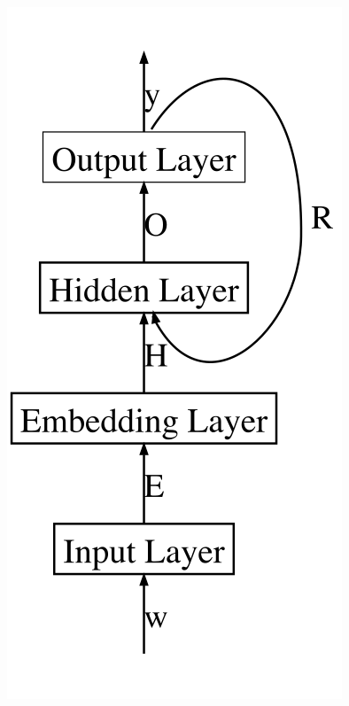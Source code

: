 \documentclass[citation\_needed]{subfiles}
\begin{document}
\begin{figure}[ht!]
\begin{minipage}{0.325\linewidth}
    \includegraphics[scale=0.4]{images/NN/LD-RNN/JordanRNN_inkscape}
    \end{minipage}
    \begin{minipage}{0.325\linewidth}
    \centering

\end{minipage}
\end{figure}
\end{document}
